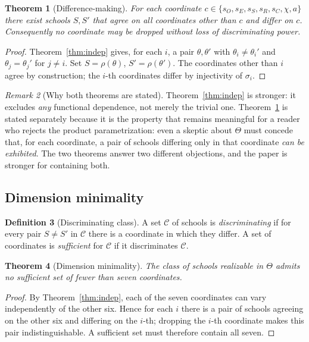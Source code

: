 \documentclass[11pt]{article}
\newtheorem{theorem}{Theorem}[section]
\theoremstyle{definition}
\newtheorem{definition}[theorem]{Definition}
\theoremstyle{remark}
\newtheorem{remark}[theorem]{Remark}
\newcommand{\Th}{\Theta}
\newcommand{\sO}{s_O}
\newcommand{\sE}{s_E}
\newcommand{\sS}{s_S}
\newcommand{\sR}{s_R}
\newcommand{\sC}{s_C}
\begin{document}
\begin{theorem}[Difference-making]\label{thm:nonred}
For each coordinate $c\in\{\sO,\sE,\sS,\sR,\sC,\chi,a\}$ there exist schools $S,S'$ that agree on all coordinates other than $c$ and differ on $c$. Consequently no coordinate may be dropped without loss of discriminating power.
\end{theorem}

\begin{proof}
Theorem~\ref{thm:indep} gives, for each $i$, a pair $\theta,\theta'$ with $\theta_i\ne\theta_i'$ and $\theta_j=\theta_j'$ for $j\ne i$. Set $S=\rho(\theta)$, $S'=\rho(\theta')$. The coordinates other than $i$ agree by construction; the $i$-th coordinates differ by injectivity of $\sigma_i$.
\end{proof}

\begin{remark}[Why both theorems are stated]\label{rem:both}
Theorem~\ref{thm:indep} is stronger: it excludes \emph{any} functional dependence, not merely the trivial one. Theorem~\ref{thm:nonred} is stated separately because it is the property that remains meaningful for a reader who rejects the product parametrization: even a skeptic about $\Th$ must concede that, for each coordinate, a pair of schools differing only in that coordinate \emph{can be exhibited}. The two theorems answer two different objections, and the paper is stronger for containing both.
\end{remark}

\subsection{Dimension minimality}

\begin{definition}[Discriminating class]\label{def:discr}
A set $\mathcal{C}$ of schools is \emph{discriminating} if for every pair $S\ne S'$ in $\mathcal{C}$ there is a coordinate in which they differ. A set of coordinates is \emph{sufficient} for $\mathcal{C}$ if it discriminates $\mathcal{C}$.
\end{definition}

\begin{theorem}[Dimension minimality]\label{thm:dim}
The class of schools realizable in $\Th$ admits no sufficient set of fewer than seven coordinates.
\end{theorem}

\begin{proof}
By Theorem~\ref{thm:indep}, each of the seven coordinates can vary independently of the other six. Hence for each $i$ there is a pair of schools agreeing on the other six and differing on the $i$-th; dropping the $i$-th coordinate makes this pair indistinguishable. A sufficient set must therefore contain all seven.
\end{proof}
\end{document}
